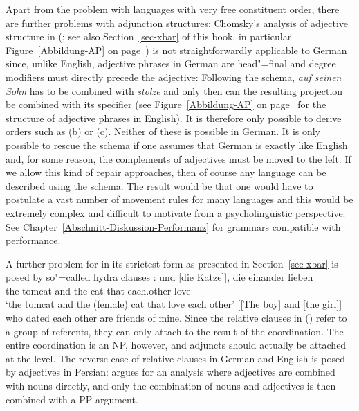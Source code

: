 \addlines[2]
Apart from the problem with languages with very free constituent order, there are further problems with adjunction structures: Chomsky's analysis of adjective structure
in \xbart (\citealp[]{Chomsky70a}; see also Section~\ref{sec-xbar} of this book, in
particular Figure~\ref{Abbildung-AP} on page~\pageref{Abbildung-AP}) is not straightforwardly applicable to German since, unlike
English, adjective phrases in German are head"=final and degree modifiers must directly precede the
adjective: 
\eal
{}
\zl
Following the \xbar schema, \emph{auf seinen Sohn} has to be combined with \emph{stolze} and only then can the
resulting \abar projection be combined with its specifier (see Figure~\ref{Abbildung-AP} on page~\pageref{Abbildung-AP} for the structure of adjective
phrases in English). It is therefore only possible to derive orders such as (b) or (c). Neither of these
is possible in German. It is only possible to rescue the \xbar schema if one assumes that German is
exactly like English and, for some reason, the complements of adjectives must be moved to the left. If we allow this kind of repair
approaches, then of course any language can be described using the \xbar schema. The result would be that one would have
to postulate a vast number of movement rules for many languages and this would be extremely complex and difficult
to motivate from a psycholinguistic perspective. See Chapter~\ref{Abschnitt-Diskussion-Performanz} for grammars compatible with performance.

A further problem for \xbart in its strictest form as presented in Section~\ref{sec-xbar} is posed by so"=called hydra clauses \citep{PR70a,Link84a-u,Kiss2005a}:
\eal
\ex {}
\gll [[der Kater] und [die Katze]], die einander lieben\\
     \spacebr{}\spacebr{}the tomcat and the cat that each.other love\\
\glt `the tomcat and the (female) cat that love each other'
\ex {}[[The boy] and [the girl]] who dated each other are friends of mine. 
\zl
Since the relative clauses in () refer to a group of referents, they can only attach to the result of the coordination.
The entire coordination is an NP, however, and adjuncts should actually be attached at the \xbar level. The reverse case of relative clauses
in German and English is posed by adjectives in Persian: \citet{Samvelian2007a} argues for an analysis where adjectives are combined with nouns
directly, and only the combination of nouns and adjectives is then combined with a PP argument.

